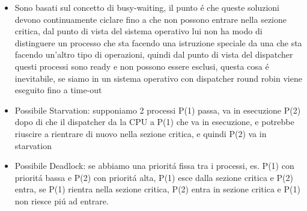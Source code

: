 \begin{itemize}
    \item Sono basati sul concetto di busy-waiting, il punto é che queste soluzioni devono continuamente ciclare fino a che non possono entrare nella sezione critica, dal punto di vista del sistema operativo lui non ha modo di distinguere un processo che sta facendo una istruzione speciale da una che sta facendo un'altro tipo di operazioni, quindi dal punto di vista del dispatcher questi processi sono ready e non possono essere esclusi, questa cosa é inevitabile, se siamo in un sistema operativo con dispatcher round robin viene eseguito fino a time-out
    \item Possibile Starvation: supponiamo 2 processi P(1) passa, va in esecuzione P(2) dopo di che il dispatcher da la CPU a P(1) che va in esecuzione, e potrebbe riuscire a rientrare di nuovo nella sezione critica, e quindi P(2) va in starvation
    \item Possibile Deadlock: se abbiamo una prioritá fissa tra i processi, es. P(1) con prioritá bassa e P(2) con prioritá alta, P(1) esce dalla sezione critica e P(2) entra, se P(1) rientra nella sezione critica, P(2) entra in sezione critica e P(1) non riesce piú ad entrare.
\end{itemize}
\

















































